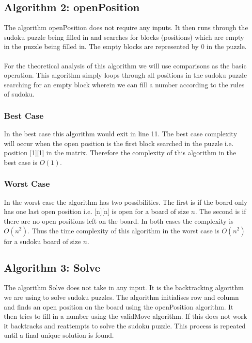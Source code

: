 \documentclass[12pt,a4paper,titlepage]{article}
\begin{document}
\subsection{Algorithm 2: openPosition}

The algorithm openPosition does not require any inputs. It then runs through the sudoku puzzle being filled in and searches for blocks (positions) which are empty in the puzzle being filled in. The empty blocks are represented by 0 in the puzzle.
\\
\\
For the theoretical analysis of this algorithm we will use comparisons as the basic operation. This algorithm simply loops through all positions in the sudoku puzzle searching for an empty block wherein we can fill a number according to the rules of sudoku. 

\subsubsection{Best Case}

In the best case this algorithm would exit in line 11. The best case complexity will occur when the open position is the first block searched in the puzzle i.e. position [1][1] in the matrix. Therefore the complexity of this algorithm in the best case is $O(1)$.

\subsubsection{Worst Case}

In the worst case the algorithm has two possibilities. The first is if the board only has one last open position i.e. [n][n] is open for a board of size $n$. The second is if there are no open positions left on the board. In both cases the complexity is $O(n^{2})$. Thus the time complexity of this algorithm in the worst case is $O(n^{2})$ for a sudoku board of size $n$.

\subsection{Algorithm 3: Solve}

The algorithm Solve does not take in any input. It is the backtracking algorithm we are using to solve sudoku puzzles. The algorithm initialises row and column and finds an open position on the board using the openPosition algorithm. It then tries to fill in a number using the validMove algorithm. If this does not work it backtracks and reattempts to solve the sudoku puzzle. This process is repeated until a final unique solution is found.
\end{document}

